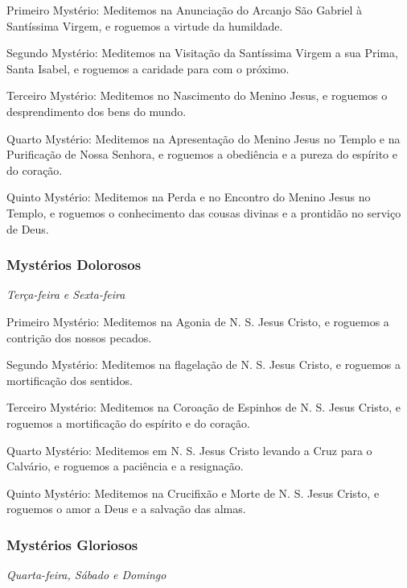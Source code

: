 {\redx Primeiro Mystério:} Meditemos na Anunciação do Arcanjo São Gabriel à Santíssima Virgem, e roguemos a virtude da humildade.\par
{\redx Segundo Mystério:} Meditemos na Visitação da Santíssima Virgem a sua Prima, Santa Isabel, e roguemos a caridade para com o próximo.\par
{\redx Terceiro Mystério:} Meditemos no Nascimento do Menino Jesus, e roguemos o desprendimento dos bens do mundo.\par
{\redx Quarto Mystério:} Meditemos na Apresentação do Menino Jesus no Templo e na Purificação de Nossa Senhora, e roguemos a obediência e a pureza do espírito e do coração.\par
{\redx Quinto Mystério:} Meditemos na Perda e no Encontro do Menino Jesus no Templo, e roguemos o conhecimento das cousas divinas e a prontidão no serviço de Deus.

\subsubsection{Mystérios Dolorosos}
\begin{nscenter}\emph{Terça-feira e Sexta-feira}\end{nscenter}

{\redx Primeiro Mystério:} Meditemos na Agonia de N. S. Jesus Cristo, e roguemos a contrição dos nossos pecados.\par
{\redx Segundo Mystério:} Meditemos na flagelação de N. S. Jesus Cristo, e roguemos a mortificação dos sentidos.\par
{\redx Terceiro Mystério:} Meditemos na Coroação de Espinhos de N. S. Jesus Cristo, e roguemos a mortificação do espírito e do coração.\par
{\redx Quarto Mystério:} Meditemos em N. S. Jesus Cristo levando a Cruz para o Calvário, e roguemos a paciência e a resignação.\par
{\redx Quinto Mystério:} Meditemos na Crucifixão e Morte de N. S. Jesus Cristo, e roguemos o amor a Deus e a salvação das almas.

\subsubsection{Mystérios Gloriosos}
\begin{nscenter}\emph{Quarta-feira, Sábado e Domingo}\end{nscenter}

